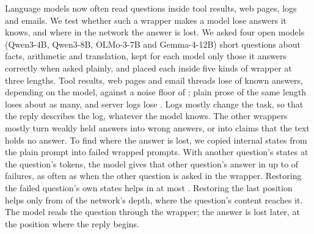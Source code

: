 Language models now often read questions inside tool results, web pages, logs and emails. We test whether such a wrapper makes a model lose answers it knows, and where in the network the answer is lost. We asked four open models (Qwen3-4B, Qwen3-8B, OLMo-3-7B and Gemma-4-12B) \NItems{} short questions about facts, arithmetic and translation, kept for each model only those it answers correctly when asked plainly, and placed each inside five kinds of wrapper at three lengths. Tool results, web pages and email threads lose \LostStruct{} of known answers, depending on the model, against a noise floor of \FloorLost{}; plain prose of the same length loses about as many, and server logs lose \LostLog{}. Logs mostly change the task, so that the reply describes the log, whatever the model knows. The other wrappers mostly turn weakly held answers into wrong answers, or into claims that the text holds no answer. To find where the answer is lost, we copied internal states from the plain prompt into failed wrapped prompts. With another question's states at the question's tokens, the model gives that other question's answer in up to \SwapPeak{} of failures, as often as when the other question is asked in the wrapper. Restoring the failed question's own states helps in at most \RestorePeak{}. Restoring the last position helps only from \HandoffDepth{} of the network's depth, where the question's content reaches it. The model reads the question through the wrapper; the answer is lost later, at the position where the reply begins.

